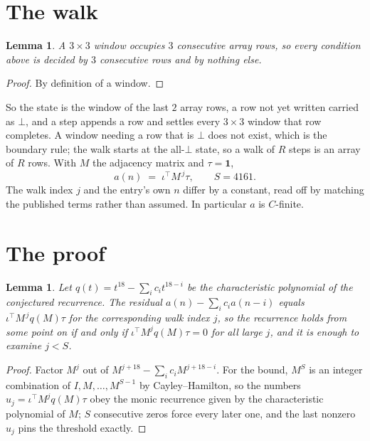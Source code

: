 \documentclass[11pt,a4paper]{article}
\theoremstyle{plain}
\newtheorem{lemma}[theorem]{Lemma}
\theoremstyle{definition}
\begin{document}
\section{The walk}

\begin{lemma}\label{lem:win}
A $3\times3$ window occupies $3$ consecutive array rows, so every condition above is
decided by $3$ consecutive rows and by nothing else.
\end{lemma}

\begin{proof}
By definition of a window.
\end{proof}

So the state is the window of the last $2$ array rows, a row not yet written carried as
$\bot$, and a step appends a row and settles every $3\times3$ window that row completes. A
window needing a row that is $\bot$ does not exist, which is the boundary rule; the walk starts
at the all-$\bot$ state, so a walk of $R$ steps is an array of $R$ rows. With $M$ the adjacency
matrix and $\tau=\mathbf{1}$,
\[
a(n)\;=\;\iota^{\!\top}M^{\,j}\tau ,\qquad S=4161.
\]
The walk index $j$ and the entry's own $n$ differ by a constant, read off by matching the
published terms rather than assumed. In particular $a$ is $C$-finite.

\section{The proof}

\begin{lemma}\label{lem:crit}
Let $q(t)=t^{18}-\sum_i c_it^{18-i}$ be the characteristic polynomial of the
conjectured recurrence. The residual $a(n)-\sum_ic_ia(n-i)$ equals
$\iota^{\!\top}M^{\,j}q(M)\tau$ for the corresponding walk index $j$, so the recurrence
holds from some point on if and only if $\iota^{\!\top}M^{j}q(M)\tau=0$ for all large $j$,
and it is enough to examine $j<S$.
\end{lemma}

\begin{proof}
Factor $M^{j}$ out of $M^{j+18}-\sum_ic_iM^{j+18-i}$. For the bound, $M^{S}$
is an integer combination of $I,M,\dots,M^{S-1}$ by Cayley--Hamilton, so the numbers
$u_j=\iota^{\!\top}M^{j}q(M)\tau$ obey the monic recurrence given by the characteristic
polynomial of $M$; $S$ consecutive zeros force every later one, and the last nonzero $u_j$
pins the threshold exactly.
\end{proof}
\end{document}
